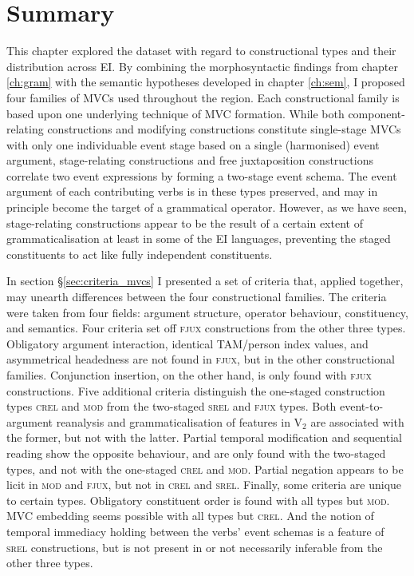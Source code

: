 \section{Summary}

This chapter explored the dataset with regard to constructional types and their distribution across EI. By combining the morphosyntactic findings from chapter \ref{ch:gram} with the semantic hypotheses developed in chapter \ref{ch:sem}, I proposed four families of MVCs used throughout the region. Each constructional family is based upon one underlying technique of MVC formation. While both component-relating constructions and modifying constructions constitute single-stage MVCs with only one individuable event stage based on a single (harmonised) event argument, stage-relating constructions and free juxtaposition constructions correlate two event expressions by forming a two-stage event schema. The event argument of each contributing verbs is in these types preserved, and may in principle become the target of a grammatical operator. However, as we have seen, stage-relating constructions appear to be the result of a certain extent of grammaticalisation at least in some of the EI languages, preventing the staged constituents to act like fully independent constituents. 

In section §\ref{sec:criteria_mvcs} I presented a set of criteria that, applied together, may unearth differences between the four constructional families. The criteria were taken from four fields: argument structure, operator behaviour, constituency, and semantics. Four criteria set off \textsc{fjux} constructions from the other three types. Obligatory argument interaction, identical TAM/person index values, and asymmetrical headedness are not found in \textsc{fjux}, but in the other constructional families. Conjunction insertion, on the other hand, is only found with \textsc{fjux} constructions. Five additional criteria distinguish the one-staged construction types \textsc{crel} and \textsc{mod} from the two-staged \textsc{srel} and \textsc{fjux} types. Both event-to-argument reanalysis and grammaticalisation of features in V$_2$ are associated with the former, but not with the latter. Partial temporal modification and sequential reading show the opposite behaviour, and are only found with the two-staged types, and not with the one-staged \textsc{crel} and \textsc{mod}. Partial negation appears to be licit in \textsc{mod} and \textsc{fjux}, but not in \textsc{crel} and \textsc{srel}. Finally, some criteria are unique to certain types. Obligatory constituent order is found with all types but \textsc{mod}. MVC embedding seems possible with all types but \textsc{crel}. And the notion of temporal immediacy holding between the verbs' event schemas is a feature of \textsc{srel} constructions, but is not present in or not necessarily inferable from the other three types.


